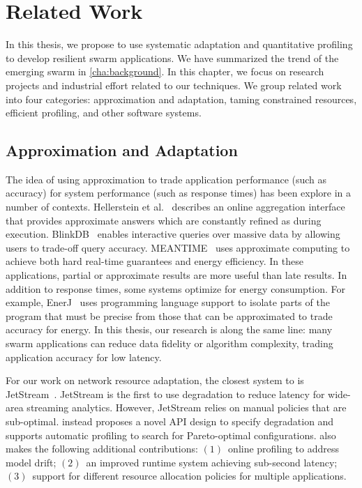 \documentclass[thesis.tex]{subfiles}
\begin{document}
\chapter{Related Work}
\label{cha:related-work}

In this thesis, we propose to use systematic adaptation and quantitative
profiling to develop resilient swarm applications. We have summarized the trend
of the emerging swarm in \autoref{cha:background}. In this chapter, we focus on
research projects and industrial effort related to our techniques. We group
related work into four categories: approximation and adaptation, taming
constrained resources, efficient profiling, and other software systems.

\section{Approximation and Adaptation}
\label{sec:appr-adapt}

The idea of using approximation to trade application performance (such as
accuracy) for system performance (such as response times) has been explore in a
number of contexts.  Hellerstein et al.~\cite{hellerstein1997online} describes
an online aggregation interface that provides approximate answers which are
constantly refined as during execution. BlinkDB~\cite{agarwal2013blinkdb}
enables interactive queries over massive data by allowing users to trade-off
query accuracy. MEANTIME~\cite{farrell2016meantime} uses approximate computing
to achieve both hard real-time guarantees and energy efficiency. In these
applications, partial or approximate results are more useful than late
results. In addition to response times, some systems optimize for energy
consumption. For example, EnerJ~\cite{sampson2011enerj} uses programming
language support to isolate parts of the program that must be precise from those
that can be approximated to trade accuracy for energy. In this thesis, our
research is along the same line: many swarm applications can reduce data
fidelity or algorithm complexity, trading application accuracy for low latency.


For our work on network resource adaptation, the closest system to \awstream{}
is JetStream~\cite{rabkin2014aggregation}. JetStream is the first to use
degradation to reduce latency for wide-area streaming analytics. However,
JetStream relies on manual policies that are sub-optimal. \awstream{} instead
proposes a novel API design to specify degradation and supports automatic
profiling to search for Pareto-optimal configurations. \awstream{} also makes
the following additional contributions: $(1)$~online profiling to address model
drift; $(2)$~an improved runtime system achieving sub-second latency;
$(3)$~support for different resource allocation policies for multiple
applications.
\end{document}
